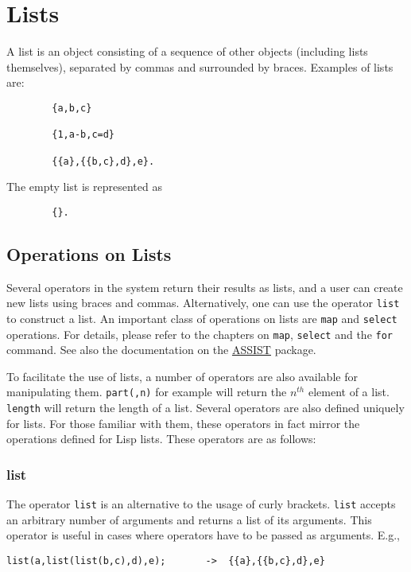 \chapter{Lists}

A list is an object consisting of a sequence of other objects
(including lists themselves), separated by commas and surrounded by
braces.  Examples of lists are:
\begin{verbatim}
        {a,b,c}

        {1,a-b,c=d}

        {{a},{{b,c},d},e}.
\end{verbatim}
The empty list is represented as
\begin{verbatim}
        {}.
\end{verbatim}

\section{Operations on Lists}

Several operators in the system return their results as lists, and a user
can create new lists using braces and commas.  Alternatively, one can use
the operator \texttt{list} to construct a list.  An important class of operations
on lists are \texttt{map} and \texttt{select} operations.  For details, please refer to the
chapters on \texttt{map}, \texttt{select} and the \texttt{for} command.  See also the documentation
on the \hyperlink{ASSIST}{ASSIST} package.

To facilitate the use of
lists, a number of operators are also available for manipulating
them.
\texttt{part(,n)} for example will return the
$n^{th}$ element of a list. 
\texttt{length} will return the
length of a list.  Several operators are also defined uniquely for lists.
For those familiar with them, these operators in fact mirror the
operations defined for Lisp lists.  These operators are as follows:

\subsection{list}
\hypertarget{operator:LIST}{}

The operator \texttt{list} is an alternative to the usage of curly brackets. \texttt{list}
accepts an arbitrary number of arguments and returns a list
of its arguments. This operator is useful in cases where operators
have to be passed as arguments. E.g.,
\begin{verbatim}
list(a,list(list(b,c),d),e);       ->  {{a},{{b,c},d},e}
\end{verbatim}


